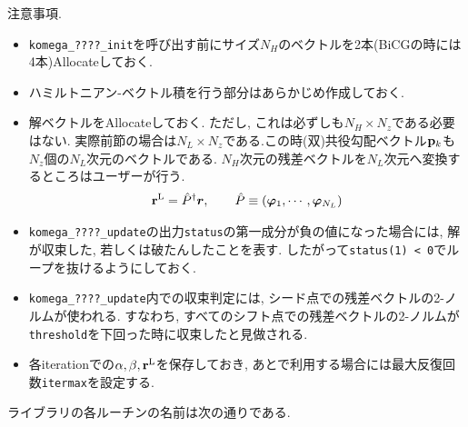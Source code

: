 \documentclass[12pt,titlepage]{jarticle}
\begin{document}
注意事項. 
\begin{itemize}
\item \verb|komega_????_init|を呼び出す前にサイズ$N_H$のベクトルを2本(BiCGの時には4本)Allocateしておく.
\item ハミルトニアン-ベクトル積を行う部分はあらかじめ作成しておく.
\item 解ベクトルをAllocateしておく. ただし, これは必ずしも$N_H \times N_z$である必要はない.
  実際前節の場合は$N_L \times N_z$である.この時(双)共役勾配ベクトル${{\bf p}_k}$も
  $N_z$個の$N_L$次元のベクトルである.
  $N_H$次元の残差ベクトルを$N_L$次元へ変換するところはユーザーが行う.
  \begin{align}
    {\bf r}^{\rm L} = {\hat P}^\dagger {\boldsymbol r}, \qquad
    {\hat P} \equiv ({\boldsymbol \varphi}_1, \cdots, {\boldsymbol \varphi}_{N_L})
  \end{align}
\item \verb|komega_????_update|の出力\verb|status|の第一成分が負の値になった場合には,
  解が収束した, 若しくは破たんしたことを表す.
  したがって\verb|status(1) < 0|でループを抜けるようにしておく.
\item \verb|komega_????_update|内での収束判定には, シード点での残差ベクトルの2-ノルムが使われる.
  すなわち, すべてのシフト点での残差ベクトルの2-ノルムが\verb|threshold|を下回った時に収束したと見做される.
\item 各iterationでの$\alpha, \beta, {\bf r}^{\rm L}$を保存しておき, 
あとで利用する場合には最大反復回数\verb|itermax|を設定する.
\end{itemize}

ライブラリの各ルーチンの名前は次の通りである.
\end{document}
